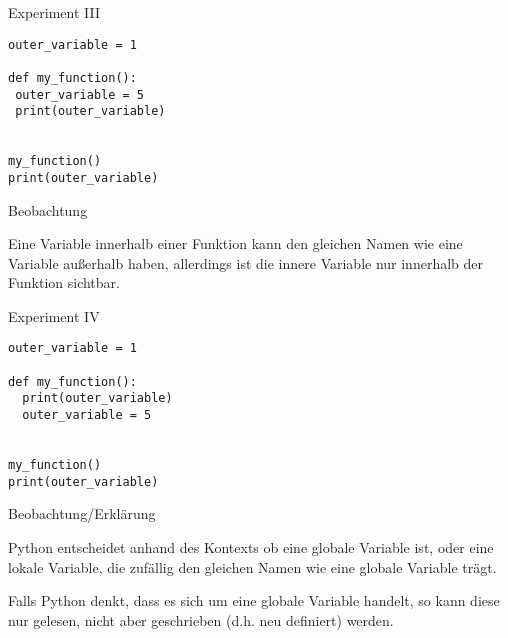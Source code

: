 \begin{fragile}

\begin{block}{Experiment III}
\vspace{2pt}

\begin{verbatim}
outer_variable = 1

def my_function(): 
 outer_variable = 5
 print(outer_variable)


my_function()
print(outer_variable)
\end{verbatim}
\vspace{12pt}

\end{block}

\begin{exampleblock}{Beobachtung}

\pause 

Eine Variable innerhalb einer Funktion kann den gleichen Namen wie eine Variable außerhalb haben, allerdings ist die innere Variable nur innerhalb der Funktion sichtbar. 
\end{exampleblock}


\end{fragile}


\begin{fragile}
	
\begin{block}{Experiment IV}
\vspace{2pt}

\begin{verbatim}
outer_variable = 1

def my_function(): 
  print(outer_variable)
  outer_variable = 5


my_function()
print(outer_variable)
\end{verbatim}
\vspace{12pt}

\end{block}

\begin{exampleblock}{Beobachtung/Erklärung}

\pause 

Python entscheidet anhand des Kontexts ob  eine globale Variable ist, oder eine lokale Variable, die zufällig den gleichen Namen wie eine globale Variable trägt. 

\pause 

Falls Python denkt, dass es sich um eine globale Variable handelt, so kann diese nur gelesen, nicht aber geschrieben (d.h. neu definiert) werden. 

\end{exampleblock}

	
\end{fragile}


